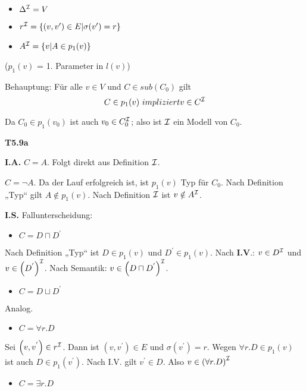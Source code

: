 \begin{itemize}
  \item $\Delta^{\mathcal{I}} = V$
  \item $r^{\mathcal{I}} = \{(v,v')\in E | \sigma (v') = r\}$
  \item $A^{\mathcal{I}} = \{v | A \in p_1(v)\}$
\end{itemize}

($p_1(v)$ = 1. Parameter in $l(v)$)

Behauptung: Für alle $v \in V$ und $C \in sub(C_0)$ gilt $$C \in p_1(v)\ impliziert v \in C^{\mathcal{I}}$$

Da $C_0 \in p_1(v_0)$ ist auch $v_0 \in C_0^{\mathcal{I}}$; also ist $\mathcal{I}$ ein Modell von $C_0$.

\textbf{T5.9a}

\textbf{I.A.} $C = A$. Folgt direkt aus Definition $\mathcal{I}$.

$C = \neg A$. Da der Lauf erfolgreich ist, ist
$p_{1}\left( v \right)$ Typ für $C_{0}$. Nach Definition „Typ`` gilt
$A \notin p_{1}\left( v \right)$. Nach Definition $\mathcal{I}$ ist
$v \notin A^{\mathcal{I}}$.

\textbf{I.S.} Fallunterscheidung:

\begin{itemize}
\item
  $C = D \sqcap D^{'}$
\end{itemize}

Nach Definition „Typ`` ist $D \in p_{1}\left( v \right)$ und
$D^{'} \in p_{1}\left( v \right)$. Nach \textbf{I.V}.: $v \in D^{\mathcal{I}}$
und $v \in \left( D^{'} \right)^{\mathcal{I}}$. Nach Semantik:
$v \in \left( D \sqcap D^{'} \right)^{\mathcal{I}}$.

\begin{itemize}
\item
  $C = D \sqcup D^{'}$
\end{itemize}

Analog.

\begin{itemize}
\item
  $C = \forall r.D$
\end{itemize}

Sei $\left( v,v^{'} \right) \in r^{\mathcal{I}}$. Dann ist
$\left( v,v^{'} \right) \in E$ und $\sigma\left( v^{'} \right) = r$.
Wegen $\forall r.D \in p_{1}(v)$ ist auch
$D \in p_{1}\left( v^{'} \right)$. Nach I.V. gilt $v^{'} \in D$.
Also $v \in \left( \forall r.D \right)^{\mathcal{I}}$

\begin{itemize}
\item
  $C = \exists r.D$
\end{itemize}

